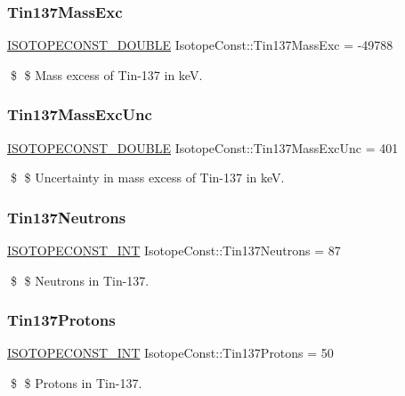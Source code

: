 \subsubsection{\texorpdfstring{Tin137\+Mass\+Exc}{Tin137MassExc}}
{\footnotesize\ttfamily \mbox{\hyperlink{group___isotope_const-_macros_ga8f45a7272ce02c0b4c65c44636ed719a}{I\+S\+O\+T\+O\+P\+E\+C\+O\+N\+S\+T\+\_\+\+D\+O\+U\+B\+LE}} Isotope\+Const\+::\+Tin137\+Mass\+Exc = -\/49788}

\$ \$ Mass excess of Tin-\/137 in keV. \mbox{\label{group___isotope_const-_tin-_sn137_ga6d196a24dfd8246892d2d2eb84bc503a}} 
\subsubsection{\texorpdfstring{Tin137\+Mass\+Exc\+Unc}{Tin137MassExcUnc}}
{\footnotesize\ttfamily \mbox{\hyperlink{group___isotope_const-_macros_ga8f45a7272ce02c0b4c65c44636ed719a}{I\+S\+O\+T\+O\+P\+E\+C\+O\+N\+S\+T\+\_\+\+D\+O\+U\+B\+LE}} Isotope\+Const\+::\+Tin137\+Mass\+Exc\+Unc = 401}

\$ \$ Uncertainty in mass excess of Tin-\/137 in keV. \mbox{\label{group___isotope_const-_tin-_sn137_ga242ef49915b7ffe4da4850a4d5e126df}} 
\subsubsection{\texorpdfstring{Tin137\+Neutrons}{Tin137Neutrons}}
{\footnotesize\ttfamily \mbox{\hyperlink{group___isotope_const-_macros_ga5f18360b3e99483a35c32d789e62621c}{I\+S\+O\+T\+O\+P\+E\+C\+O\+N\+S\+T\+\_\+\+I\+NT}} Isotope\+Const\+::\+Tin137\+Neutrons = 87}

\$ \$ Neutrons in Tin-\/137. \mbox{\label{group___isotope_const-_tin-_sn137_ga0f542dad81c86566aeba5839a753d3cc}} 
\subsubsection{\texorpdfstring{Tin137\+Protons}{Tin137Protons}}
{\footnotesize\ttfamily \mbox{\hyperlink{group___isotope_const-_macros_ga5f18360b3e99483a35c32d789e62621c}{I\+S\+O\+T\+O\+P\+E\+C\+O\+N\+S\+T\+\_\+\+I\+NT}} Isotope\+Const\+::\+Tin137\+Protons = 50}

\$ \$ Protons in Tin-\/137. 